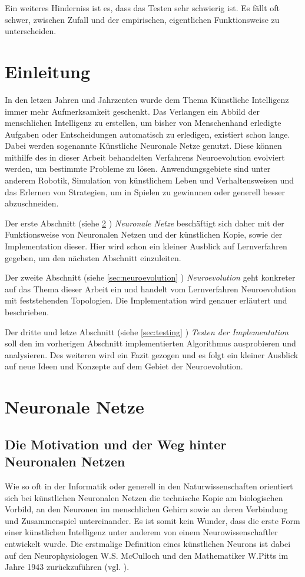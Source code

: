 \documentclass[parskip=half,titlepage]{scrartcl}
\begin{document}
Ein weiteres Hinderniss ist es, dass das Testen sehr schwierig ist. Es fällt oft schwer, zwischen Zufall und der empirischen, eigentlichen Funktionsweise zu unterscheiden.

\section{Einleitung}
In den letzen Jahren und Jahrzenten wurde dem Thema Künstliche Intelligenz immer mehr Aufmerksamkeit geschenkt. Das Verlangen ein Abbild der menschlichen Intelligenz zu erstellen, um bisher von Menschenhand erledigte Aufgaben oder Entscheidungen automatisch zu erledigen, existiert schon lange. Dabei werden sogenannte Künstliche Neuronale Netze genutzt. Diese können mithilfe des in dieser Arbeit behandelten Verfahrens Neuroevolution evolviert werden, um bestimmte Probleme zu lösen. Anwendungsgebiete sind unter anderem Robotik, Simulation von künstlichem Leben und Verhaltensweisen und das Erlernen von Strategien, um in Spielen zu gewinnnen oder generell besser abzuschneiden.

Der erste Abschnitt (siehe \cref{sec:neuronal_nets} ) \textit{Neuronale Netze} beschäftigt sich daher mit der Funktionsweise von Neuronalen Netzen und der künstlichen Kopie, sowie der Implementation dieser. Hier wird schon ein kleiner Ausblick auf Lernverfahren gegeben, um den nächsten Abschnitt einzuleiten.


Der zweite Abschnitt (siehe \cref{sec:neuroevolution} ) \textit{Neuroevolution} geht konkreter auf das Thema dieser Arbeit ein und handelt vom Lernverfahren Neuroevolution mit feststehenden Topologien. Die Implementation wird genauer erläutert und beschrieben.

Der dritte und letze Abschnitt (siehe \cref{sec:testing} ) \textit{Testen der Implementation} soll den im vorherigen Abschnitt implementierten Algorithmus ausprobieren und analysieren. Des weiteren wird ein Fazit gezogen und es folgt ein kleiner Ausblick auf neue Ideen und Konzepte auf dem Gebiet der Neuroevolution.

\section{Neuronale Netze}
\label{sec:neuronal_nets}
\subsection{Die Motivation und der Weg hinter Neuronalen Netzen}
Wie so oft in der Informatik oder generell in den Naturwissenschaften orientiert sich bei künstlichen Neuronalen Netzen die technische Kopie am biologischen Vorbild, an den Neuronen im menschlichen Gehirn sowie an deren Verbindung und Zusammenspiel untereinander. Es ist somit kein Wunder, dass die erste Form einer künstlichen Intelligenz unter anderem von einem Neurowissenschaftler entwickelt wurde. Die erstmalige Definition eines künstlichen Neurons ist dabei auf den Neurophysiologen W.S. McCulloch und den Mathematiker W.Pitts im Jahre 1943 zurückzuführen (vgl. \cite[S. 3]{neuronale_netze_psychologie}). 
\end{document}
